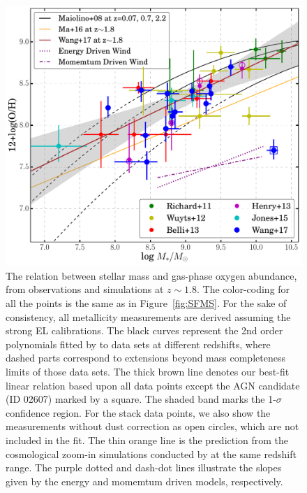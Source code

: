 \begin{figure}
    \centering
    \includegraphics[width=\textwidth]{fig/MZR.pdf}
    \caption[The mass-metallicity relation at $z\sim1.8$.]{The relation between stellar mass and gas-phase oxygen abundance, from
    observations and simulations at $z\sim1.8$. The color-coding for all the points is the
    same as in Figure~\ref{fig:SFMS}. For the sake of consistency, all metallicity
    measurements are derived assuming the \citet{2008A&A...488..463M} strong EL calibrations.
    The black curves represent the 2nd order polynomials
    fitted by \citet{2008A&A...488..463M} to data sets at different redshifts, where dashed
    parts correspond to extensions beyond mass completeness limits of those data sets.  The
    thick brown line denotes our best-fit linear relation based upon all data
    points except the AGN candidate (\ie ID 02607) marked by a square.
    The shaded band marks the 1-$\sigma$ confidence region.  For the \citet{Henry:2013gx}
    stack data points, we also show the measurements without dust correction as open circles,
    which are not included in the fit.
    The thin orange line is the prediction from the cosmological zoom-in simulations
    conducted by \citet{Ma:2016gw} at the same redshift range.
    The purple dotted and dash-dot lines illustrate the slopes given by the energy and momemtum driven models, respectively.}
    \label{fig:MZR}
\end{figure}

